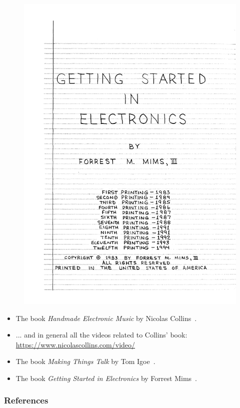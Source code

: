 \documentclass[screen, aspectratio=43]{beamer}
\begin{document}
\begin{frame}
\begin{figure}
\includegraphics[scale=0.12]{img/gettingstartedelectronics-book.pdf}
\end{figure}
\begin{itemize}
\item The book \emph{Handmade Electronic Music} by Nicolas Collins~\cite{Collins.2006.handmadebook}.
\item ... and in general all the videos related to Collins' book:\\
\url{https://www.nicolascollins.com/video/}
\item The book \emph{Making Things Talk} by Tom Igoe~\cite{Igoe.2007.making}.
\item The book \emph{Getting Started in Electronics} by Forrest Mims~\cite{Mims.1983.radioshack}.
\end{itemize}
\end{frame}
%
\begin{frame}
  \frametitle{References}
  \printbibliography
\end{frame}
%
\end{document}
